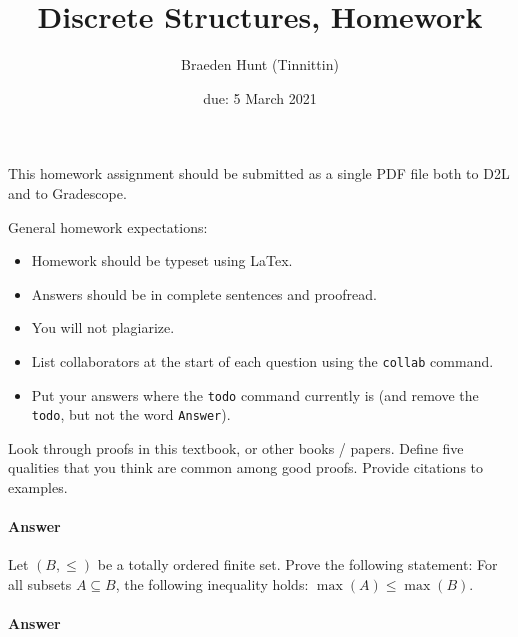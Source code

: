 \documentclass{article}
\title{Discrete Structures, Homework \hwnum}
\author{Braeden Hunt (Tinnittin)}
\date{due: 5 March 2021}
\begin{document}
\maketitle

This homework assignment should be
submitted as a single PDF file both to D2L and to Gradescope.

General homework expectations:
\begin{itemize}
    \item Homework should be typeset using LaTex.
    \item Answers should be in complete sentences and proofread.
    \item You will not plagiarize.
    \item List collaborators at the start of each question using the \texttt{collab} command.
    \item Put your answers where the \texttt{todo} command currently is (and
        remove the \texttt{todo}, but not the word \texttt{Answer}).
\end{itemize}


 

Look through proofs in this textbook, or other books / papers.  Define five
qualities that you think are common among good proofs. Provide citations to
examples.


\paragraph{Answer}




 

Let $(B,\leq)$ be a totally ordered finite set. Prove the following
statement: For all subsets $A \subseteq B$, the following inequality
holds: $\max(A) \leq \max(B)$.

\paragraph{Answer}
\end{document}
